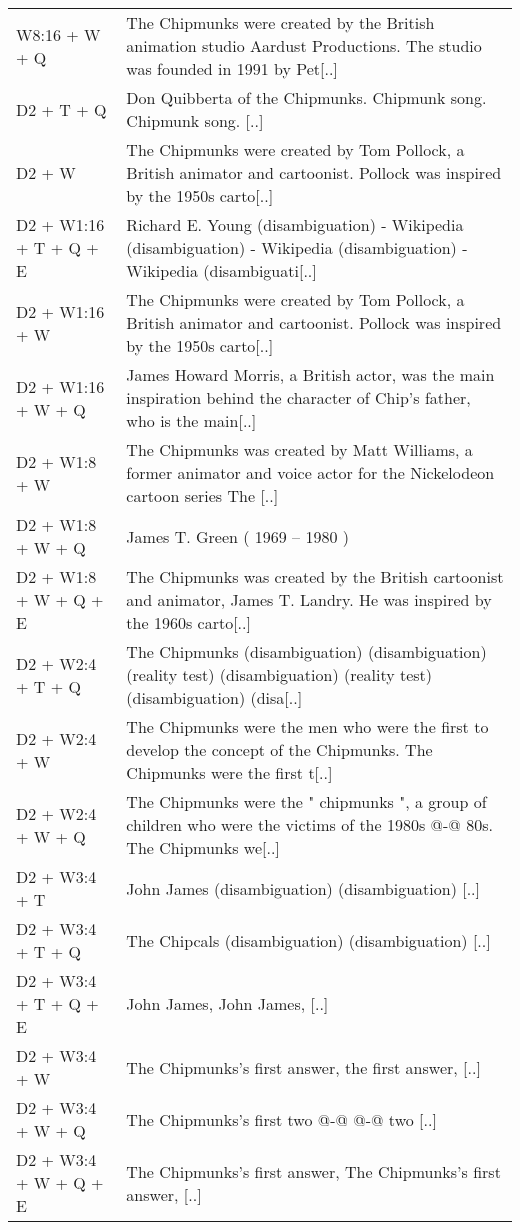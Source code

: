 {\begin{longtable}{lp{8cm}}
W8:16 + W + Q & The Chipmunks were created by the British animation studio Aardust Productions. The studio was founded in 1991 by Pet[..] \\
D2 + T + Q & Don Quibberta of the Chipmunks. Chipmunk song. Chipmunk song. [..] \\
D2 + W & The Chipmunks were created by Tom Pollock, a British animator and cartoonist. Pollock was inspired by the 1950s carto[..] \\
D2 + W1:16 + T + Q + E & Richard E. Young (disambiguation) - Wikipedia (disambiguation) - Wikipedia (disambiguation) - Wikipedia (disambiguati[..] \\
D2 + W1:16 + W & The Chipmunks were created by Tom Pollock, a British animator and cartoonist. Pollock was inspired by the 1950s carto[..] \\
D2 + W1:16 + W + Q & James Howard Morris, a British actor, was the main inspiration behind the character of Chip's father, who is the main[..] \\
D2 + W1:8 + W & The Chipmunks was created by Matt Williams, a former animator and voice actor for the Nickelodeon cartoon series The [..] \\
D2 + W1:8 + W + Q & James T. Green ( 1969 – 1980 )  \\
D2 + W1:8 + W + Q + E & The Chipmunks was created by the British cartoonist and animator, James T. Landry. He was inspired by the 1960s carto[..] \\
D2 + W2:4 + T + Q & The Chipmunks (disambiguation) (disambiguation) (reality test) (disambiguation) (reality test) (disambiguation) (disa[..] \\
D2 + W2:4 + W & The Chipmunks were the men who were the first to develop the concept of the Chipmunks. The Chipmunks were the first t[..] \\
D2 + W2:4 + W + Q & The Chipmunks were the " chipmunks ", a group of children who were the victims of the 1980s @-@ 80s. The Chipmunks we[..] \\
D2 + W3:4 + T & John James (disambiguation) (disambiguation) [..] \\
D2 + W3:4 + T + Q & The Chipcals (disambiguation) (disambiguation) [..] \\
D2 + W3:4 + T + Q + E & John James, John James, [..] \\
D2 + W3:4 + W & The Chipmunks's first answer, the first answer, [..] \\
D2 + W3:4 + W + Q & The Chipmunks's first two @-@ @-@ two [..] \\
D2 + W3:4 + W + Q + E & The Chipmunks's first answer, The Chipmunks's first answer, [..] \\

\end{longtable}}
